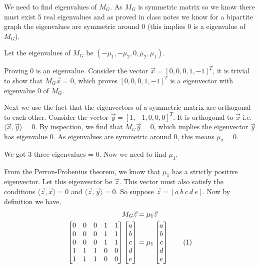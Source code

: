 \documentclass[12pt,a4paper]{article}
\newcommand\numberthis{\addtocounter{equation}{1}\tag{\theequation}}
\begin{document}
We need to find eigenvalues of $M_G$. As $M_G$ is symmetric matrix so we know there must exist 5 real eigenvalues and as proved in class notes we know for a bipartite graph the eigenvalues are symmetric around 0 (this implies 0 is a eigenvalue of $M_G$).

Let the eigenvalues of $M_G$ be $(-\mu_1, -\mu_2, 0, \mu_2, \mu_1)$.

Proving 0 is an eigenvalue. Consider the vector $\vec{x} = [0,0,0,1,-1]^T$, it is trivial to show that $M_G\vec{x} = 0$, which proves $[0,0,0,1,-1]^T$ is a eigenvector with eigenvalue 0 of $M_G$.

Next we use the fact that the eigenvectors of a symmetric matrix are orthogonal to each other. Consider the vector $\vec{y} = [1,-1,0,0,0]^T$. It is orthogonal to $\vec{x}$ i.e. $\langle \vec{x}, \vec{y} \rangle = 0$. By inspection, we find that $M_G\vec{y} = 0$, which implies the eigenvector $\vec{y}$ has eigenvalue 0. As eigenvalues are symmetric around 0, this means $\mu_2 = 0$.

We got 3 three eigenvalues = 0. Now we need to find $\mu_1$.

From the Perron-Frobenius theorem, we know that $\mu_1$ has a strictly positive eigenvector. Let this eigenvector be $\vec{z}$. This vector must also satisfy the conditions $\langle \vec{z}, \vec{x} \rangle = 0$ and $\langle \vec{z}, \vec{y} \rangle = 0$. So suppose $\vec{z} = [a\ b\ c\ d\ e]$. Now by definition we have,
\begin{align*}
    M_G\vec{z} &= \mu_1\vec{z} \\
    \begin{bmatrix}
        0 & 0 & 0 & 1 & 1 \\
        0 & 0 & 0 & 1 & 1 \\
        0 & 0 & 0 & 1 & 1 \\
        1 & 1 & 1 & 0 & 0 \\
        1 & 1 & 1 & 0 & 0 \\
    \end{bmatrix}
    \begin{bmatrix}
        a \\
        b \\
        c \\
        d \\
        e \\
    \end{bmatrix} &= \mu_1
    \begin{bmatrix}
        a \\
        b \\
        c \\
        d \\
        e \\
    \end{bmatrix} \numberthis
\end{align*}
\end{document}
